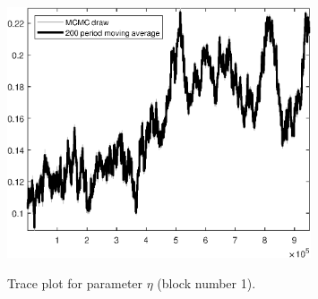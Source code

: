 \begin{figure}[H]
\centering
  \includegraphics[width=0.8\textwidth]{BRS_growth_util_sectoral/graphs/TracePlot_eta_blck_1}\\
    \caption{Trace plot for parameter ${\eta}$ (block number 1).}
\end{figure}
